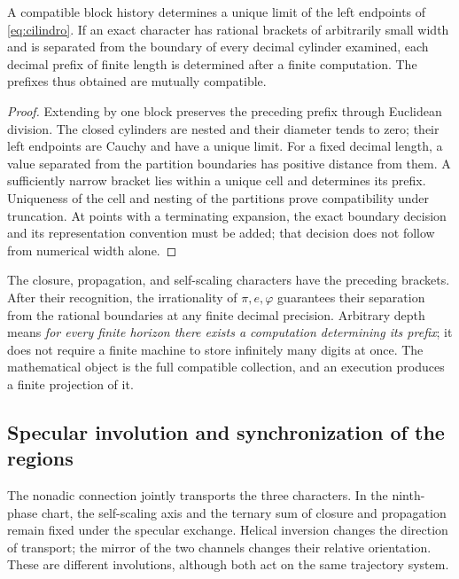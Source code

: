 \begin{theorem}
A compatible block history determines a unique limit of the left endpoints of \eqref{eq:cilindro}. If an exact character has rational brackets of arbitrarily small width and is separated from the boundary of every decimal cylinder examined, each decimal prefix of finite length is determined after a finite computation. The prefixes thus obtained are mutually compatible.
\end{theorem}
\begin{proof}
Extending by one block preserves the preceding prefix through Euclidean division. The closed cylinders are nested and their diameter tends to zero; their left endpoints are Cauchy and have a unique limit. For a fixed decimal length, a value separated from the partition boundaries has positive distance from them. A sufficiently narrow bracket lies within a unique cell and determines its prefix. Uniqueness of the cell and nesting of the partitions prove compatibility under truncation. At points with a terminating expansion, the exact boundary decision and its representation convention must be added; that decision does not follow from numerical width alone.
\end{proof}

The closure, propagation, and self-scaling characters have the preceding brackets. After their recognition, the irrationality of \(\pi,e,\varphi\) guarantees their separation from the rational boundaries at any finite decimal precision. Arbitrary depth means \emph{for every finite horizon there exists a computation determining its prefix}; it does not require a finite machine to store infinitely many digits at once. The mathematical object is the full compatible collection, and an execution produces a finite projection of it.

\subsection{Specular involution and synchronization of the regions}

The nonadic connection jointly transports the three characters. In the ninth-phase chart, the self-scaling axis and the ternary sum of closure and propagation remain fixed under the specular exchange. Helical inversion changes the direction of transport; the mirror of the two channels changes their relative orientation. These are different involutions, although both act on the same trajectory system.

